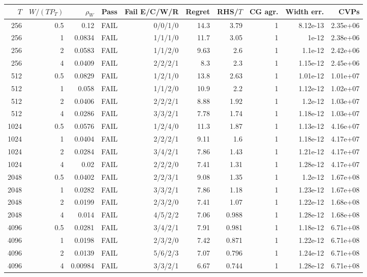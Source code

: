 \begin{tabular}{rrrcrrrrrr}
\toprule
$T$ & $W/(TP_T)$ & $\rho_W$ & Pass & Fail E/C/W/R & Regret & RHS/$T$ & CG agr. & Width err. & CVPs \\
\midrule
256 & 0.5 & 0.12 & FAIL & 0/0/1/0 & 14.3 & 3.79 & 1 & 8.12e-13 & 2.35e+06 \\
256 & 1 & 0.0834 & FAIL & 1/1/1/0 & 11.7 & 3.05 & 1 & 1e-12 & 2.38e+06 \\
256 & 2 & 0.0583 & FAIL & 1/1/2/0 & 9.63 & 2.6 & 1 & 1.1e-12 & 2.42e+06 \\
256 & 4 & 0.0409 & FAIL & 2/2/2/1 & 8.3 & 2.3 & 1 & 1.15e-12 & 2.45e+06 \\
512 & 0.5 & 0.0829 & FAIL & 1/2/1/0 & 13.8 & 2.63 & 1 & 1.01e-12 & 1.01e+07 \\
512 & 1 & 0.058 & FAIL & 1/1/2/0 & 10.9 & 2.2 & 1 & 1.12e-12 & 1.02e+07 \\
512 & 2 & 0.0406 & FAIL & 2/2/2/1 & 8.88 & 1.92 & 1 & 1.2e-12 & 1.03e+07 \\
512 & 4 & 0.0286 & FAIL & 3/3/2/1 & 7.78 & 1.74 & 1 & 1.18e-12 & 1.03e+07 \\
1024 & 0.5 & 0.0576 & FAIL & 1/2/4/0 & 11.3 & 1.87 & 1 & 1.13e-12 & 4.16e+07 \\
1024 & 1 & 0.0404 & FAIL & 2/2/2/1 & 9.11 & 1.6 & 1 & 1.18e-12 & 4.17e+07 \\
1024 & 2 & 0.0284 & FAIL & 3/4/2/1 & 7.86 & 1.43 & 1 & 1.21e-12 & 4.17e+07 \\
1024 & 4 & 0.02 & FAIL & 2/2/2/0 & 7.41 & 1.31 & 1 & 1.28e-12 & 4.17e+07 \\
2048 & 0.5 & 0.0402 & FAIL & 2/2/3/1 & 9.08 & 1.35 & 1 & 1.2e-12 & 1.67e+08 \\
2048 & 1 & 0.0282 & FAIL & 3/3/2/1 & 7.86 & 1.18 & 1 & 1.23e-12 & 1.67e+08 \\
2048 & 2 & 0.0199 & FAIL & 2/3/2/0 & 7.41 & 1.07 & 1 & 1.22e-12 & 1.68e+08 \\
2048 & 4 & 0.014 & FAIL & 4/5/2/2 & 7.06 & 0.988 & 1 & 1.28e-12 & 1.68e+08 \\
4096 & 0.5 & 0.0281 & FAIL & 3/4/2/1 & 7.91 & 0.981 & 1 & 1.18e-12 & 6.71e+08 \\
4096 & 1 & 0.0198 & FAIL & 2/3/2/0 & 7.42 & 0.871 & 1 & 1.22e-12 & 6.71e+08 \\
4096 & 2 & 0.0139 & FAIL & 5/6/2/3 & 7.07 & 0.796 & 1 & 1.24e-12 & 6.71e+08 \\
4096 & 4 & 0.00984 & FAIL & 3/3/2/1 & 6.67 & 0.744 & 1 & 1.28e-12 & 6.71e+08 \\
\bottomrule
\end{tabular}
